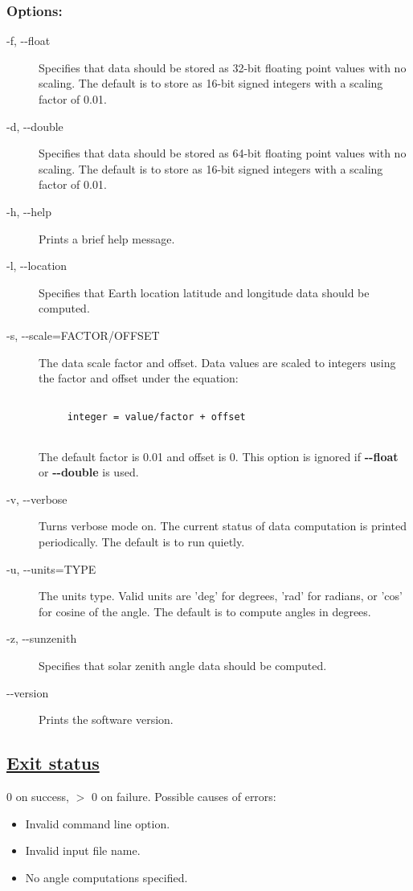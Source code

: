 \subsubsection*{Options:}
\begin{description}
\item[-f, -{-}float]Specifies that data should be stored as 32-bit floating point values with no scaling. The default is to store as 16-bit signed integers with a scaling factor of 0.01.
\item[-d, -{-}double]Specifies that data should be stored as 64-bit floating point values with no scaling. The default is to store as 16-bit signed integers with a scaling factor of 0.01.
\item[-h, -{-}help]Prints a brief help message.
\item[-l, -{-}location]Specifies that Earth location latitude and longitude data should be computed.
\item[-s, -{-}scale=FACTOR/OFFSET]The data scale factor and offset. Data values are scaled to integers using the factor and offset under the equation:\\ 
\begin{verbatim}

     integer = value/factor + offset
   
\end{verbatim}
 The default factor is 0.01 and offset is 0. This option is ignored if \textbf{-{-}float}
 or \textbf{-{-}double}
 is used.
\item[-v, -{-}verbose]Turns verbose mode on. The current status of data computation is printed periodically. The default is to run quietly.
\item[-u, -{-}units=TYPE]The units type. Valid units are 'deg' for degrees, 'rad' for radians, or 'cos' for cosine of the angle. The default is to compute angles in degrees.
\item[-z, -{-}sunzenith]Specifies that solar zenith angle data should be computed.
\item[-{-}version]Prints the software version.

\end{description}
\subsection*{\underline{Exit status}}


 0 on success, $>$ 0 on failure. Possible causes of errors:
\begin{itemize}
\item  Invalid command line option. 
\item  Invalid input file name. 
\item  No angle computations specified. 

\end{itemize}
